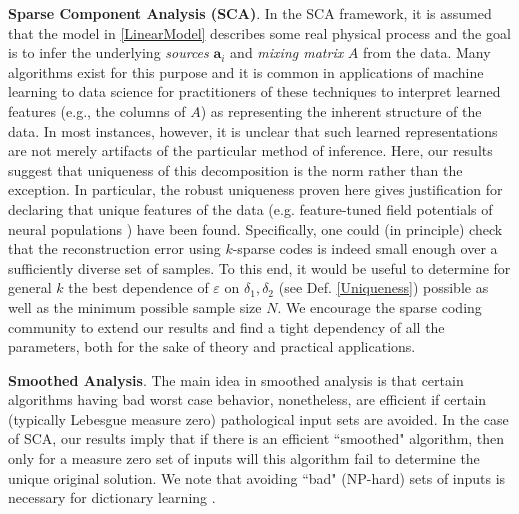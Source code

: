\documentclass[journal, onecolumn]{IEEEtran}
\begin{document}

%
%

\textbf{Sparse Component Analysis (SCA)}.  
In the SCA framework, it is assumed that the model in \eqref{LinearModel} describes some real physical process and the goal is to infer the underlying \emph{sources} $\mathbf{a}_i$ and \emph{mixing matrix} $A$ from the data. Many algorithms exist for this purpose and it is common in applications of machine learning to data science for practitioners of these techniques to interpret learned features (e.g., the columns of $A$) as representing the inherent structure of the data. In most instances, however, it is unclear that such learned representations are not merely artifacts of the particular method of inference. Here, our results suggest that uniqueness of this decomposition is the norm rather than the exception. In particular, the robust uniqueness proven here gives justification for declaring that unique features of the data (e.g. feature-tuned field potentials of neural populations  \cite{agarwal2014spatially}) have been found. Specifically, one could (in principle) check that the reconstruction error using $k$-sparse codes is indeed small enough over a sufficiently diverse set of samples. To this end, it would be useful to determine for general $k$ the best dependence of $\varepsilon$ on $\delta_1, \delta_2$ (see Def. \ref{Uniqueness}) possible as well as the minimum possible sample size $N$. We encourage the sparse coding community to extend our results and find a tight dependency of all the parameters, both for the sake of theory and practical applications.


\textbf{Smoothed Analysis}.
The main idea in smoothed analysis \cite{spielman2004smoothed} is that certain algorithms having bad worst case behavior, nonetheless, are efficient if certain (typically Lebesgue measure zero) pathological input sets are avoided.  In the case of SCA, our results imply that if there is an efficient ``smoothed" algorithm, then only for a measure zero set of inputs will this algorithm fail to determine the unique original solution.  We note that avoiding ``bad" (NP-hard) sets of inputs is necessary for dictionary learning \cite{razaviyayn2015computational}.
\end{document}
